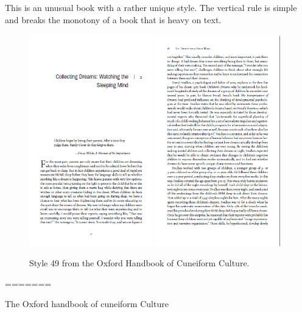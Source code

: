 This is an unusual book with a rather unique style. The vertical rule is simple and breaks the monotony of a book that is heavy on text.
\begin{figure}[ht]
\includegraphics[width=0.48\textwidth]{./chapters/chapter49}\hfill
\includegraphics[width=0.48\textwidth]{./chapters/chapter49a}
\caption{Style 49 from the Oxford Handbook of Cuneiform Culture.}
\end{figure}
=======

The Oxford handbook of cuneiform Culture



